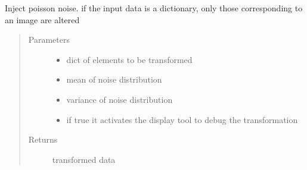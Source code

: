 \documentclass[letterpaper,10pt,english]{sphinxmanual}
\begin{document}
\begin{fulllineitems}
\label{\detokenize{ida_lib.operations:ida_lib.operations.transforms.inject_spekle_noise}}
Inject poisson noise. if the input data is a dictionary, only those corresponding to an image are altered
\begin{quote}\begin{description}
\item[{Parameters}] \leavevmode\begin{itemize}
\item {} 
 \textendash{} dict of elements to be transformed

\item {} 
 \textendash{} mean of noise distribution

\item {} 
 \textendash{} variance of noise distribution

\item {} 
 \textendash{} if true it activates the display tool to debug the transformation

\end{itemize}

\item[{Returns}] \leavevmode
transformed data

\end{description}\end{quote}

\end{fulllineitems}

\end{document}
